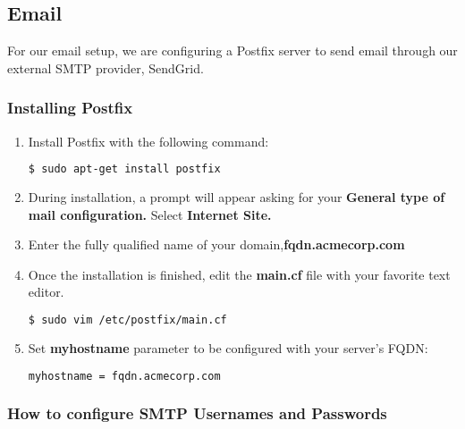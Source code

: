 \subsection{Email}

For our email setup, we are configuring a Postfix server to send email through
our external SMTP provider, SendGrid.

\subsubsection{Installing Postfix}

\begin{enumerate}
 \item { Install Postfix with the following command:
  \begin{lstlisting}[language=bash] 
  $ sudo apt-get install postfix
   \end{lstlisting}
 }
 \item { During installation, a prompt will appear asking for your
	 \textbf{General type of mail configuration.} Select \textbf{Internet
		Site.}
 }
\item {Enter the fully qualified name of your domain,\textbf{fqdn.acmecorp.com}
 }
 \item {Once the installation is finished, edit the \textbf{main.cf} file with
	 your favorite text editor.
   \begin{lstlisting}[language=bash]
 $ sudo vim /etc/postfix/main.cf
   \end{lstlisting}
 }
 \item {Set \textbf{myhostname} parameter to be configured with your server's
	 FQDN:
   \begin{lstlisting}[language=bash]
 myhostname = fqdn.acmecorp.com
   \end{lstlisting}
 }
\end{enumerate}

\subsubsection{How to configure SMTP Usernames and Passwords}


